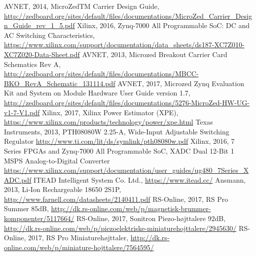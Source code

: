 \begin{thebibliography}{21} %
    AVNET, 2014, MicroZedTM Carrier Design Guide, \url{http://zedboard.org/sites/default/files/documentations/MicroZed_Carrier_Design_Guide_rev_1_5.pdf}
  	Xilinx, 2016, Zynq-7000 All Programmable SoC: DC and AC Switching Characteristics, \url{https://www.xilinx.com/support/documentation/data_sheets/ds187-XC7Z010-XC7Z020-Data-Sheet.pdf}
  	AVNET, 2013, Microzed Breakout Carrier Card Schematics Rev A, \url{http://zedboard.org/sites/default/files/documentations/MBCC-BKO_RevA_Schematic_131114.pdf}
  	AVNET, 2017, Microzed Zynq Evaluation Kit and System on Module Hardware User Guide version 1.7, \url{http://zedboard.org/sites/default/files/documentations/5276-MicroZed-HW-UG-v1-7-V1.pdf}
  	Xilinx, 2017, Xilinx Power Estimator (XPE), \url{https://www.xilinx.com/products/technology/power/xpe.html}
  	Texas Instruments, 2013, PTH08080W 2.25-A, Wide-Input Adjustable Switching Regulator \url{http://www.ti.com/lit/ds/symlink/pth08080w.pdf}
    Xilinx, 2016, 7 Series FPGAs and Zynq-7000 All Programmable SoC, XADC Dual 12-Bit 1 MSPS Analog-to-Digital Converter \url{https://www.xilinx.com/support/documentation/user_guides/ug480_7Series_XADC.pdf}
    ITEAD Intelligent System Co. Ltd., \url{https://www.itead.cc/}
    Ansmann, 2013, Li-Ion Rechargeable 18650 2S1P, \url{http://www.farnell.com/datasheets/2140411.pdf}
    RS-Online, 2017, RS Pro Summer 85dB, \url{http://dk.rs-online.com/web/p/magnetisk-brummer-komponenter/5117664/}
   RS-Online, 2017, Sonitron Piezo-højttalere 92dB, \url{http://dk.rs-online.com/web/p/piezoelektriske-miniaturehojttalere/2945630/}
   RS-Online, 2017, RS Pro Miniaturehøjttaler, \url{http://dk.rs-online.com/web/p/miniature-hojttalere/7564595/}
\end{thebibliography}
